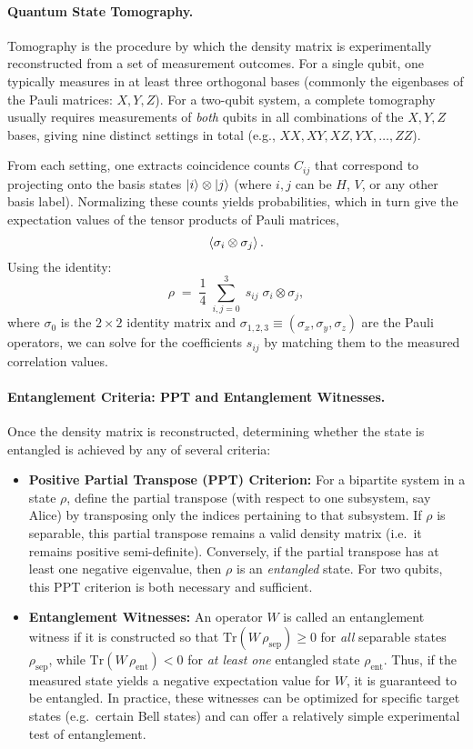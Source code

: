 \paragraph{Quantum State Tomography.}
Tomography is the procedure by which the density matrix is experimentally reconstructed from a set of measurement outcomes. For a single qubit, one typically measures in at least three orthogonal bases (commonly the eigenbases of the Pauli matrices: $X, Y, Z$). For a two-qubit system, a complete tomography usually requires measurements of \emph{both} qubits in all combinations of the $X, Y, Z$ bases, giving nine distinct settings in total (e.g., $XX, XY, XZ, YX, \dots, ZZ$).

From each setting, one extracts coincidence counts $C_{ij}$ that correspond to projecting onto the basis states $\ket{i}\otimes\ket{j}$ (where $i,j$ can be $H$, $V$, or any other basis label). Normalizing these counts yields probabilities, which in turn give the expectation values of the tensor products of Pauli matrices, 
\[
\expval{\sigma_i \otimes \sigma_j}.
\]
Using the identity:
\[
\rho \;=\; \frac{1}{4}\;\sum_{i,j=0}^{3}\; s_{ij}\; \sigma_i \otimes \sigma_j,
\]
where $\sigma_0$ is the $2\times 2$ identity matrix and $\sigma_{1,2,3}\equiv(\sigma_x,\sigma_y,\sigma_z)$ are the Pauli operators, we can solve for the coefficients $s_{ij}$ by matching them to the measured correlation values. 

\paragraph{Entanglement Criteria: PPT and Entanglement Witnesses.}
Once the density matrix is reconstructed, determining whether the state is entangled is achieved by any of several criteria:

\begin{itemize}
    \item \textbf{Positive Partial Transpose (PPT) Criterion:} For a bipartite system in a state $\rho$, define the partial transpose (with respect to one subsystem, say Alice) by transposing only the indices pertaining to that subsystem. If $\rho$ is separable, this partial transpose remains a valid density matrix (i.e.\ it remains positive semi-definite). Conversely, if the partial transpose has at least one negative eigenvalue, then $\rho$ is an \emph{entangled} state. For two qubits, this PPT criterion is both necessary and sufficient.
    
    \item \textbf{Entanglement Witnesses:} An operator $W$ is called an entanglement witness if it is constructed so that $\mathrm{Tr}(W\,\rho_\text{sep}) \ge 0$ for \emph{all} separable states $\rho_\text{sep}$, while $\mathrm{Tr}(W\,\rho_\text{ent}) < 0$ for \emph{at least one} entangled state $\rho_\text{ent}$. Thus, if the measured state yields a negative expectation value for $W$, it is guaranteed to be entangled. In practice, these witnesses can be optimized for specific target states (e.g.\ certain Bell states) and can offer a relatively simple experimental test of entanglement.
\end{itemize}

